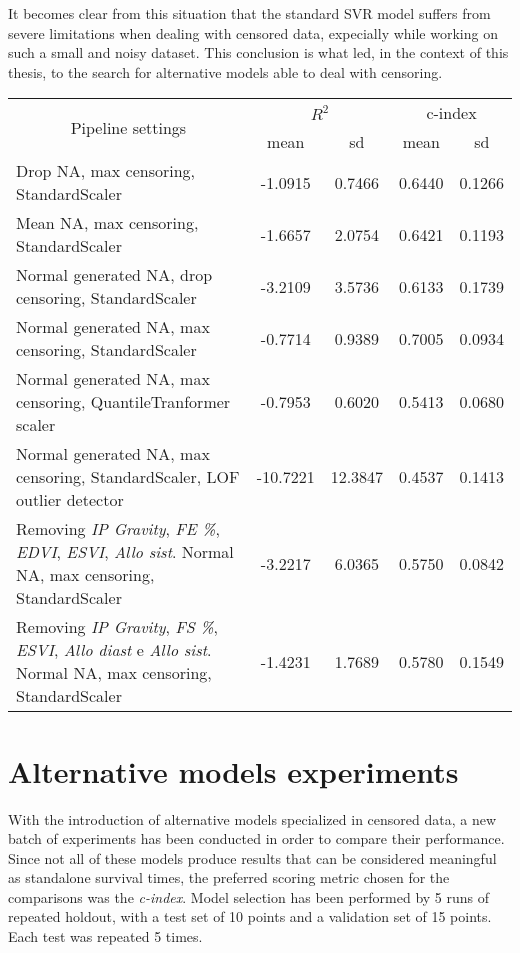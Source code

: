 \documentclass[12pt]{report}
\begin{document}
It becomes clear from this situation that the standard SVR model suffers from severe limitations when dealing with censored data, expecially while working on such a small and noisy dataset. This conclusion is what led, in the context of this thesis, to the search for alternative models able to deal with censoring.

\begin{center}
 \begin{tabular}{ |m{7cm}|c|c|c|c| }
\hline
\multicolumn{1}{|c|}{\multirow{2}{*}{Pipeline settings}} & \multicolumn{2}{|c|}{$R^2$} & \multicolumn{2}{|c|}{c-index} \\ \cline{2-5}
& mean & sd & mean & sd \\ \hline
Drop NA, max censoring, StandardScaler & -1.0915 & 0.7466 & 0.6440 & 0.1266 \\ \hline
Mean NA, max censoring, StandardScaler & -1.6657 & 2.0754 & 0.6421 & 0.1193 \\ \hline
Normal generated NA, drop censoring, StandardScaler & -3.2109 & 3.5736 & 0.6133 & 0.1739 \\ \hline
Normal generated NA, max censoring, StandardScaler & -0.7714 & 0.9389 & 0.7005 & 0.0934 \\ \hline
Normal generated NA, max censoring, QuantileTranformer scaler & -0.7953 & 0.6020 & 0.5413 & 0.0680 \\ \hline
Normal generated NA, max censoring, StandardScaler, LOF outlier detector & -10.7221 & 12.3847 & 0.4537 & 0.1413 \\ \hline
Removing \textit{IP Gravity}, \textit{FE \%}, \textit{EDVI}, \textit{ESVI}, \textit{Allo sist}. Normal NA, max censoring, StandardScaler & -3.2217 & 6.0365 & 0.5750 & 0.0842 \\ \hline
Removing \textit{IP Gravity}, \textit{FS \%}, \textit{ESVI}, \textit{Allo diast} e \textit{Allo sist}. Normal NA, max censoring, StandardScaler & -1.4231 & 1.7689 & 0.5780 & 0.1549 \\ \hline
\end{tabular}
\label{resultstab:1}
\end{center} 

\section{Alternative models experiments}

With the introduction of alternative models specialized in censored data, a new batch of experiments has been conducted in order to compare their performance. Since not all of these models produce results that can be considered meaningful as standalone survival times, the preferred scoring metric chosen for the comparisons was the \textit{c-index}. Model selection has been performed by 5 runs of repeated holdout, with a test set of 10 points and a validation set of 15 points. Each test was repeated 5 times.
\end{document}
